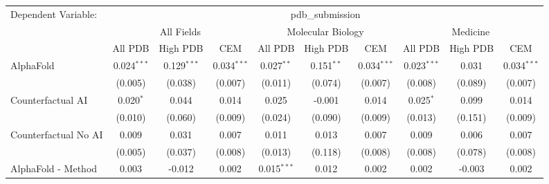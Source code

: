 \begingroup
\centering
\begin{tabular}{lccccccccc}
   \tabularnewline \midrule \midrule
   Dependent Variable: & \multicolumn{9}{c}{pdb\_submission}\\
 & \multicolumn{3}{c}{All Fields} & \multicolumn{3}{c}{Molecular Biology} & \multicolumn{3}{c}{Medicine} \\
\cmidrule(lr){2-7} \cmidrule(lr){5-10} \cmidrule(lr){8-7}
 & \multicolumn{1}{c}{All PDB} & \multicolumn{1}{c}{High PDB} & \multicolumn{1}{c}{CEM} & \multicolumn{1}{c}{All PDB} & \multicolumn{1}{c}{High PDB} & \multicolumn{1}{c}{CEM} & \multicolumn{1}{c}{All PDB} & \multicolumn{1}{c}{High PDB} & \multicolumn{1}{c}{CEM} \\
\cmidrule(lr){2-3} \cmidrule(lr){3-4} \cmidrule(lr){4-5} \cmidrule(lr){5-6} \cmidrule(lr){6-7} \cmidrule(lr){7-8} \cmidrule(lr){8-9} \cmidrule(lr){9-10} \cmidrule(lr){10-3}
   AlphaFold                                                   & 0.024$^{***}$  & 0.129$^{***}$  & 0.034$^{***}$ & 0.027$^{**}$  & 0.151$^{**}$   & 0.034$^{***}$ & 0.023$^{***}$  & 0.031         & 0.034$^{***}$\\   
                                                               & (0.005)        & (0.038)        & (0.007)       & (0.011)       & (0.074)        & (0.007)       & (0.008)        & (0.089)       & (0.007)\\   
   Counterfactual AI                                           & 0.020$^{*}$    & 0.044          & 0.014         & 0.025         & -0.001         & 0.014         & 0.025$^{*}$    & 0.099         & 0.014\\   
                                                               & (0.010)        & (0.060)        & (0.009)       & (0.024)       & (0.090)        & (0.009)       & (0.013)        & (0.151)       & (0.009)\\   
   Counterfactual No AI                                        & 0.009          & 0.031          & 0.007         & 0.011         & 0.013          & 0.007         & 0.009          & 0.006         & 0.007\\   
                                                               & (0.005)        & (0.037)        & (0.008)       & (0.013)       & (0.118)        & (0.008)       & (0.008)        & (0.078)       & (0.008)\\   
   AlphaFold - Method                                          & 0.003          & -0.012         & 0.002         & 0.015$^{***}$ & 0.012          & 0.002         & 0.002          & -0.003        & 0.002\\   

\end{tabular}

